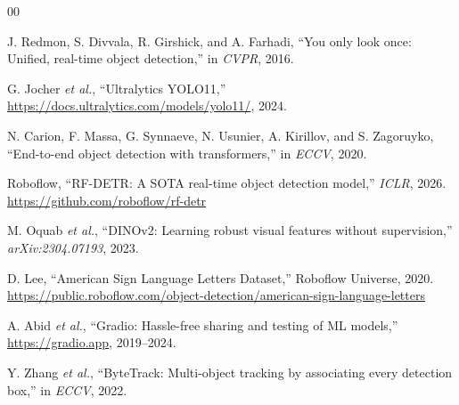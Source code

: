 \documentclass[conference]{IEEEtran}
\begin{document}

\begin{thebibliography}{00}

J. Redmon, S. Divvala, R. Girshick, and A. Farhadi, ``You only look once: Unified, real-time object detection,'' in \emph{CVPR}, 2016.

G. Jocher \emph{et al.}, ``Ultralytics YOLO11,'' \url{https://docs.ultralytics.com/models/yolo11/}, 2024.

N. Carion, F. Massa, G. Synnaeve, N. Usunier, A. Kirillov, and S. Zagoruyko, ``End-to-end object detection with transformers,'' in \emph{ECCV}, 2020.

Roboflow, ``RF-DETR: A SOTA real-time object detection model,'' \emph{ICLR}, 2026. \url{https://github.com/roboflow/rf-detr}

M. Oquab \emph{et al.}, ``DINOv2: Learning robust visual features without supervision,'' \emph{arXiv:2304.07193}, 2023.

D. Lee, ``American Sign Language Letters Dataset,'' Roboflow Universe, 2020. \url{https://public.roboflow.com/object-detection/american-sign-language-letters}

A. Abid \emph{et al.}, ``Gradio: Hassle-free sharing and testing of ML models,'' \url{https://gradio.app}, 2019--2024.

Y. Zhang \emph{et al.}, ``ByteTrack: Multi-object tracking by associating every detection box,'' in \emph{ECCV}, 2022.

\end{thebibliography}
\end{document}
